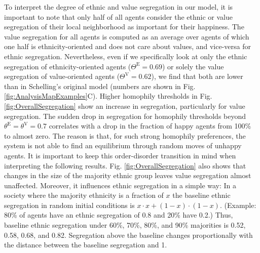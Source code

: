 \documentclass{ws-acs}
\begin{document}
{To interpret the degree of ethnic and value segregation in our model, it is important to note that only half of all agents consider the ethnic or value segregation of their local neighborhood as important for their happiness. The value segregation for all agents is computed as an average over agents of which one half is ethnicity-oriented and does not care about values, and vice-versa for ethnic segregation. Nevertheless, even if we specifically look at only the ethnic segregation of ethnicity-oriented agents ($\Theta^\text{E} = 0.69$) or solely the value segregation of value-oriented agents ($\Theta^\text{V} = 0.62$), we find that both are lower than in Schelling's original model (numbers are shown in Fig. \ref{fig:AnalysisMapExamples}C). Higher homophily thresholds in Fig. \ref{fig:OverallSegregation} show an increase in segregation, particularly for value segregation. The sudden drop in segregation for homophily thresholds beyond $\theta^\text{E} = \theta^\text{V} = 0.7$ correlates with a drop in the fraction of happy agents from 100\% to almost zero. The reason is that, for such strong homophily preferences, the system is not able to find an equilibrium through random moves of unhappy agents. It is important to keep this order-disorder transition in mind when interpreting the following results. Fig. \ref{fig:OverallSegregation} also shows that changes in the size of the majority ethnic group leaves value segregation almost unaffected. Moreover, it influences ethnic segregation in a simple way: In a society where the majority ethnicity is a fraction of $x$ the baseline ethnic segregation in random initial conditions is $x\cdot x + (1-x)\cdot (1-x)$. (Example: 80\% of agents have an ethnic segregation of 0.8 and 20\% have 0.2.) Thus, baseline ethnic segregation under 60\%, 70\%, 80\%, and 90\% majorities is 0.52, 0.58, 0.68, and 0.82. Segregation above the baseline changes proportionally with the distance between the baseline segregation and 1.

}
\end{document}
